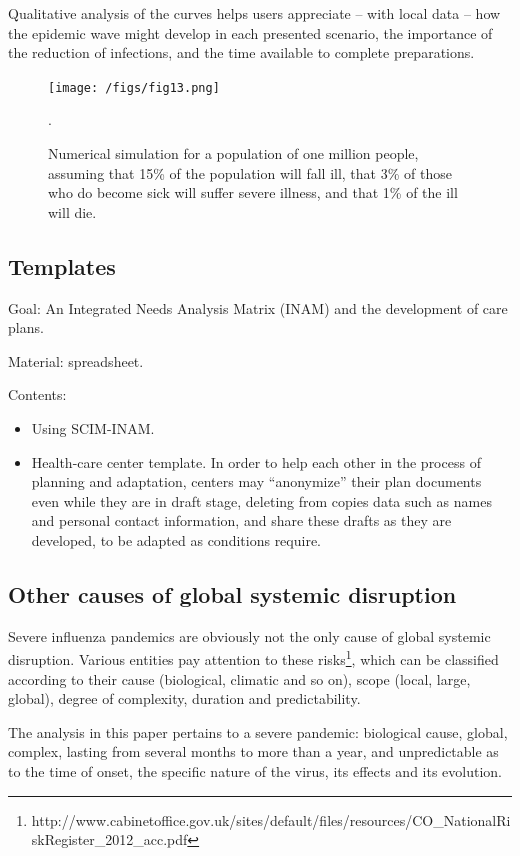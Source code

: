 \documentclass[12pt, a4]{scrartcl}
\begin{document}
Qualitative analysis of the curves helps users appreciate – with local data – how the epidemic wave might develop in each presented scenario, the importance of the reduction of infections, and the time available to complete preparations.

\begin{figure}[h]
\centering
\texttt{[image: /figs/fig13.png]}
\caption{Numerical simulation for a population of one million people, assuming that 15\% of the population will fall ill, that 3\% of those who do become sick will suffer severe illness, and that 1\% of the ill will die.}.
\end{figure}

\subsection{Templates}
Goal: An Integrated Needs Analysis Matrix (INAM) and the development of care plans.

Material: spreadsheet.

Contents:
\begin{itemize}
	\item Using SCIM-INAM.
	\item Health-care center template. In order to help each other in the process of planning and adaptation, centers may “anonymize” their plan documents even while they are in draft stage, deleting from copies data such as names and personal contact information, and share these drafts as they are developed, to be adapted as conditions require.
\end{itemize}

\subsection{Other causes of global systemic disruption}
Severe influenza pandemics are obviously not the only cause of global systemic disruption. Various entities pay attention to these risks\footnote{http://www.cabinetoffice.gov.uk/sites/default/files/resources/CO_NationalRiskRegister_2012_acc.pdf}, which can be classified according to their cause (biological, climatic and so on), scope (local, large, global), degree of complexity, duration and predictability. 

The analysis in this paper pertains to a severe pandemic: biological cause, global, complex, lasting from several months to more than a year, and unpredictable as to the time of onset, the specific nature of the virus, its effects and its evolution.
\end{document}
